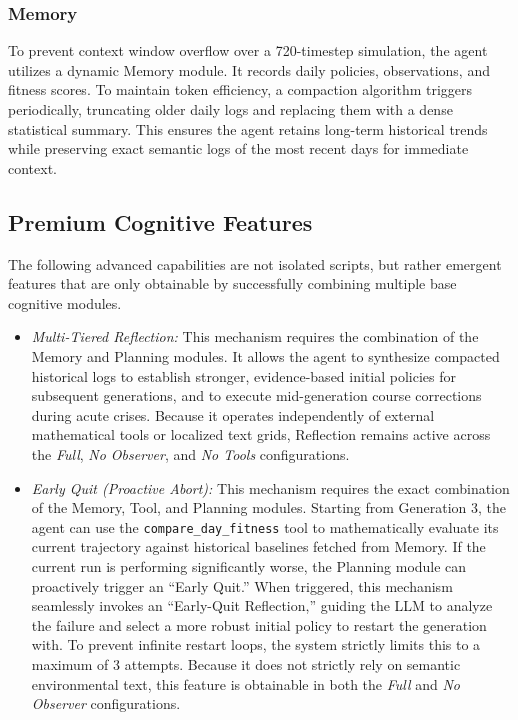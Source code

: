 \documentclass[conference]{IEEEtran}
\begin{document}
\subsubsection{Memory}
To prevent context window overflow over a 720-timestep simulation, the agent utilizes a dynamic Memory module. It records daily policies, observations, and fitness scores. To maintain token efficiency, a compaction algorithm triggers periodically, truncating older daily logs and replacing them with a dense statistical summary. This ensures the agent retains long-term historical trends while preserving exact semantic logs of the most recent days for immediate context.

\subsection{Premium Cognitive Features}
The following advanced capabilities are not isolated scripts, but rather emergent features that are only obtainable by successfully combining multiple base cognitive modules.

\begin{itemize}
    \item \textit{Multi-Tiered Reflection:} This mechanism requires the combination of the Memory and Planning modules. It allows the agent to synthesize compacted historical logs to establish stronger, evidence-based initial policies for subsequent generations, and to execute mid-generation course corrections during acute crises. Because it operates independently of external mathematical tools or localized text grids, Reflection remains active across the \textit{Full}, \textit{No Observer}, and \textit{No Tools} configurations.
    \item \textit{Early Quit (Proactive Abort):} This mechanism requires the exact combination of the Memory, Tool, and Planning modules. Starting from Generation 3, the agent can use the \texttt{compare\_day\_fitness} tool to mathematically evaluate its current trajectory against historical baselines fetched from Memory. If the current run is performing significantly worse, the Planning module can proactively trigger an ``Early Quit.'' When triggered, this mechanism seamlessly invokes an ``Early-Quit Reflection,'' guiding the LLM to analyze the failure and select a more robust initial policy to restart the generation with. To prevent infinite restart loops, the system strictly limits this to a maximum of 3 attempts. Because it does not strictly rely on semantic environmental text, this feature is obtainable in both the \textit{Full} and \textit{No Observer} configurations.
\end{itemize}
\end{document}
